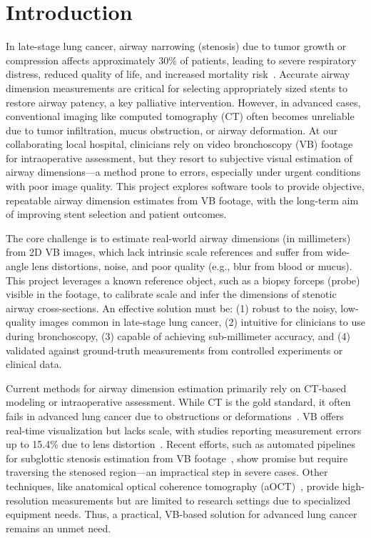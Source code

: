 \section{Introduction}
In late-stage lung cancer, airway narrowing (stenosis) due to tumor growth or compression affects approximately 30\% of patients, leading to severe respiratory distress, reduced quality of life, and increased mortality risk~\cite{Saji2010}. Accurate airway dimension measurements are critical for selecting appropriately sized stents to restore airway patency, a key palliative intervention. However, in advanced cases, conventional imaging like computed tomography (CT) often becomes unreliable due to tumor infiltration, mucus obstruction, or airway deformation. At our collaborating local hospital, clinicians rely on video bronchoscopy (VB) footage for intraoperative assessment, but they resort to subjective visual estimation of airway dimensions---a method prone to errors, especially under urgent conditions with poor image quality. This project explores software tools to provide objective, repeatable airway dimension estimates from VB footage, with the long-term aim of improving stent selection and patient outcomes.

The core challenge is to estimate real-world airway dimensions (in millimeters) from 2D VB images, which lack intrinsic scale references and suffer from wide-angle lens distortions, noise, and poor quality (e.g., blur from blood or mucus). This project leverages a known reference object, such as a biopsy forceps (probe) visible in the footage, to calibrate scale and infer the dimensions of stenotic airway cross-sections. An effective solution must be: (1) robust to the noisy, low-quality images common in late-stage lung cancer, (2) intuitive for clinicians to use during bronchoscopy, (3) capable of achieving sub-millimeter accuracy, and (4) validated against ground-truth measurements from controlled experiments or clinical data.

Current methods for airway dimension estimation primarily rely on CT-based modeling or intraoperative assessment. While CT is the gold standard, it often fails in advanced lung cancer due to obstructions or deformations~\cite{williamson2009}. VB offers real-time visualization but lacks scale, with studies reporting measurement errors up to 15.4\% due to lens distortion~\cite{Leigh2005}. Recent efforts, such as automated pipelines for subglottic stenosis estimation from VB footage~\cite{tomasini2025}, show promise but require traversing the stenosed region---an impractical step in severe cases. Other techniques, like anatomical optical coherence tomography (aOCT)~\cite{williamson2009}, provide high-resolution measurements but are limited to research settings due to specialized equipment needs. Thus, a practical, VB-based solution for advanced lung cancer remains an unmet need.


